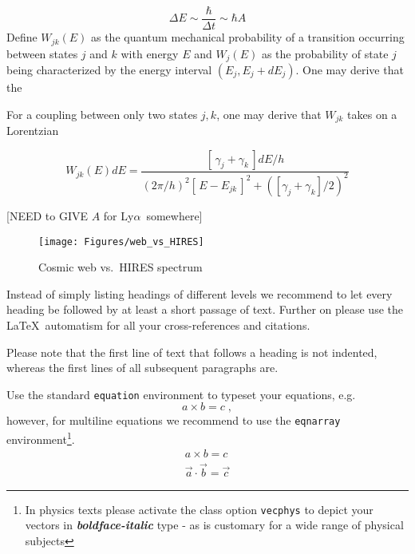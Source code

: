 \documentclass[graybox]{svmult}
\def\lya{Ly$\alpha$}
\def\ltk{\left [ \,}
\def\rtk{\, \right  ] }
\begin{document}
\begin{equation}
\Delta E \sim \frac{\hbar}{\Delta t} \sim \hbar A
\end{equation}
Define $W_{jk}(E)$ as the quantum mechanical
probability of a transition occurring 
between states $j$ and $k$ with energy $E$
and $W_j(E)$ 
as the probability of state $j$ being characterized
by the energy interval $(E_j, E_j+dE_j)$.
One may derive that the 



For a coupling between only two states $j,k$, one
may derive that $W_{jk}$ takes on a Lorentzian 

\begin{equation}
W_{jk}(E) dE = \frac{\ltk \gamma_j + \gamma_k \rtk dE/h}{
(2\pi/h)^2 \ltk E - E_{jk}\rtk^2 + ([\gamma_j + \gamma_k]/2)^2}
\end{equation}

[NEED to GIVE $A$ for \lya\ somewhere]

%
\begin{figure}[b]
\sidecaption
\texttt{[image: Figures/web\_vs\_HIRES]}
%
%
\caption{Cosmic web vs.\ HIRES spectrum
}
\label{fig:web_vs_HIRES}       %
\end{figure}


Instead of simply listing headings of different levels we recommend to
let every heading be followed by at least a short passage of text.
Further on please use the \LaTeX\ automatism for all your
cross-references and citations.

Please note that the first line of text that follows a heading is not indented, whereas the first lines of all subsequent paragraphs are.

Use the standard \verb|equation| environment to typeset your equations, e.g.
%
\begin{equation}
a \times b = c\;,
\end{equation}
%
however, for multiline equations we recommend to use the \verb|eqnarray| environment\footnote{In physics texts please activate the class option \texttt{vecphys} to depict your vectors in \textbf{\itshape boldface-italic} type - as is customary for a wide range of physical subjects}.
\begin{eqnarray}
a \times b = c \nonumber\\
\vec{a} \cdot \vec{b}=\vec{c}
\label{eq:01}
\end{eqnarray}
\end{document}
